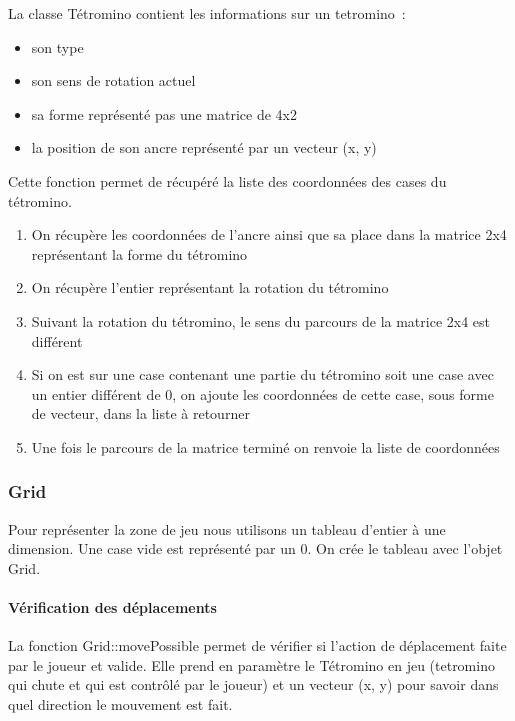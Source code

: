 \documentclass[a4paper, 12pt]{article}
\begin{document}
			La classe Tétromino contient les informations sur un tetromino :
			\begin{itemize}
				\item son type
				\item son sens de rotation actuel
				\item sa forme représenté pas une matrice de 4x2
				\item la position de son ancre représenté par un vecteur (x, y)
			\end{itemize}


			Cette fonction permet de récupéré la liste des coordonnées des cases du tétromino.
			\begin{enumerate}

				\item On récupère les coordonnées de l’ancre ainsi que sa place dans la matrice 2x4 représentant la forme du tétromino
				\item On récupère l’entier représentant la rotation du tétromino
				\item Suivant la rotation du tétromino, le sens du parcours de la matrice 2x4 est différent
				\item Si on est sur une case contenant une partie du tétromino soit une case avec un entier différent de 0, on ajoute les coordonnées de cette case, sous forme de vecteur, dans la liste à retourner
				\item Une fois le parcours de la matrice terminé on renvoie la liste de coordonnées

			\end{enumerate}



		\subsubsection{Grid}
			Pour représenter la zone de jeu nous utilisons un tableau d’entier à une dimension. Une case vide est représenté par un 0. 
			On crée le tableau avec l’objet Grid.

			\paragraph{Vérification des déplacements}
				La fonction Grid::movePossible permet de vérifier si l’action de déplacement faite par le joueur et valide. Elle prend en paramètre le Tétromino en jeu (tetromino qui chute et qui est contrôlé par le joueur) et un vecteur (x, y) pour savoir dans quel direction le mouvement est fait.
\end{document}
